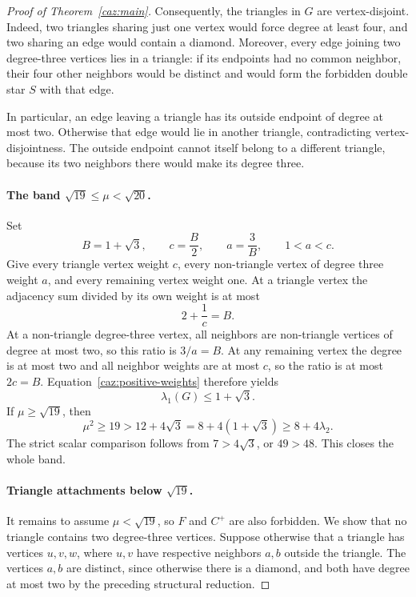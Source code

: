 \documentclass[11pt,a4paper]{article}
\numberwithin{equation}{section}
\theoremstyle{remark}
\begin{document}
\begin{proof}[Proof of Theorem~\ref{caz:main}]
Consequently, the triangles in $G$ are vertex-disjoint. Indeed,
two triangles sharing just one vertex would force degree at least
four, and two sharing an edge would contain a diamond. Moreover,
every edge joining two degree-three vertices lies in a triangle:
if its endpoints had no common neighbor, their four other
neighbors would be distinct and would form the forbidden double
star $S$ with that edge.

In particular, an edge leaving a triangle has its outside endpoint
of degree at most two. Otherwise that edge would lie in another
triangle, contradicting vertex-disjointness. The outside endpoint
cannot itself belong to a different triangle, because its two
neighbors there would make its degree three.

\paragraph{The band $\sqrt{19}\le\mu<\sqrt{20}$.}
Set
\[
 B=1+\sqrt3,
 \qquad c=\frac B2,
 \qquad a=\frac3B,
 \qquad 1<a<c.
\]
Give every triangle vertex weight $c$, every non-triangle vertex
of degree three weight $a$, and every remaining vertex weight one.
At a triangle vertex the adjacency sum divided by its own weight
is at most
\[
 2+\frac1c=B.
\]
At a non-triangle degree-three vertex, all neighbors are
non-triangle vertices of degree at most two, so this ratio is
$3/a=B$. At any remaining vertex the degree is at most two and
all neighbor weights are at most $c$, so the ratio is at most
$2c=B$. Equation~\eqref{caz:positive-weights} therefore yields
\begin{equation}
 \lambda_1(G)\le1+\sqrt3.
 \label{caz:first-perron}
\end{equation}
If $\mu\ge\sqrt{19}$, then
\[
 \mu^2\ge19>12+4\sqrt3
 =8+4(1+\sqrt3)\ge8+4\lambda_2.
\]
The strict scalar comparison follows from $7>4\sqrt3$, or
$49>48$. This closes the whole band.

\paragraph{Triangle attachments below $\sqrt{19}$.}
It remains to assume $\mu<\sqrt{19}$, so $F$ and $C^+$ are also
forbidden. We show that no triangle contains two degree-three
vertices. Suppose otherwise that a triangle has vertices $u,v,w$,
where $u,v$ have respective neighbors $a,b$ outside the triangle.
The vertices $a,b$ are distinct, since otherwise there is a
diamond, and both have degree at most two by the preceding
structural reduction.


\end{proof}
\end{document}
